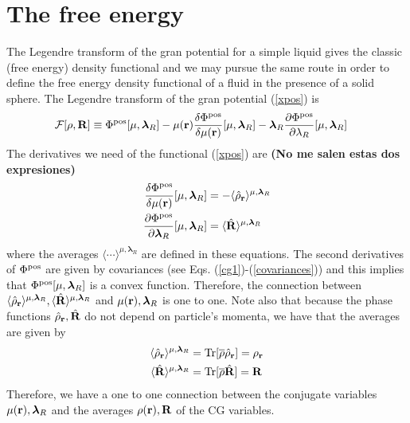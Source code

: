 \documentclass[b5paper,openright,11pt]{book}
\newcommand{\Note}[1]{{\bf \color{red}#1}}    %
\begin{document}
\section{The free energy}
The Legendre transform of the gran potential for a simple liquid gives the classic (free energy) density functional and we may pursue the same route in order to define the free energy density functional of a fluid in the presence of a solid sphere. The Legendre transform of the gran potential (\ref{xpos}) is
\begin{align}
  {\cal F}[\rho,{\bf R}]&\equiv  \Phi^{\rm pos}[\mu,\boldsymbol{\lambda}_R]
-\mu({\bf r})\frac{\delta\Phi^{\rm pos}}{\delta\mu({\bf r})}[\mu,\boldsymbol{\lambda}_R] 
-\boldsymbol{\lambda}_R\frac{\partial \Phi^{\rm pos}}{\partial \lambda_R}[\mu,\boldsymbol{\lambda}_R] 
\label{legPrev}
\end{align}
The derivatives we need of the functional (\ref{xpos}) are \Note{(No me salen estas dos expresiones)}
\begin{align}
 \frac{\delta \Phi^{\rm pos}}{\delta \mu({\bf r})}[\mu,\boldsymbol{\lambda}_R]&=-
\langle \hat{\rho}_{\bf r}\rangle^{\mu,\boldsymbol{\lambda}_R}
\nonumber\\
  \frac{\partial \Phi^{\rm pos}}{\partial \boldsymbol{\lambda}_R}[\mu,\boldsymbol{\lambda}_R]&=
\langle \hat{\bf R}\rangle^{\mu,\boldsymbol{\lambda}_R}
\end{align}
where               the                averages               $\langle
\cdots\rangle^{\mu,\boldsymbol{\lambda}_R}$   are  defined   in  these
equations.  The second  derivatives of $ \Phi^{\rm pos}$  are given by
covariances  (see   Eqs.  (\ref{cg1})-(\ref{covariances}))   and  this
implies that $\Phi^{\rm  pos}[\mu,\boldsymbol{\lambda}_R]$ is a convex
function.  Therefore, the  connection between $\langle \hat{\rho}_{\bf
  r}\rangle^{\mu,\boldsymbol{\lambda}_R},       \langle       \hat{\bf
  R}\rangle^{\mu,\boldsymbol{\lambda}_R}$         and        $\mu({\bf
  r}),\boldsymbol{\lambda}_R$ is  one to  one. Note also  that because
the phase functions  $ \hat{\rho}_{\bf r}, \hat{\bf R}$  do not depend
on particle's momenta, we have that the averages are given by
\begin{align}
  \langle \hat{\rho}_{\bf r}\rangle^{\mu,\boldsymbol{\lambda}_R} &={\rm Tr}[\overline{\rho}\hat{\rho}_{\bf r}]=\rho_{\bf r}
\nonumber\\
  \langle \hat{\bf R}\rangle^{\mu,\boldsymbol{\lambda}_R} &={\rm Tr}[\overline{\rho}\hat{\bf R}]={\bf R}
\end{align}
Therefore,  we have  a one  to  one connection  between the  conjugate
variables  $\mu({\bf  r}),\boldsymbol{\lambda}_R$   and  the  averages
$\rho({\bf  r}),{\bf  R}$  of  the  CG  variables.
\end{document}

